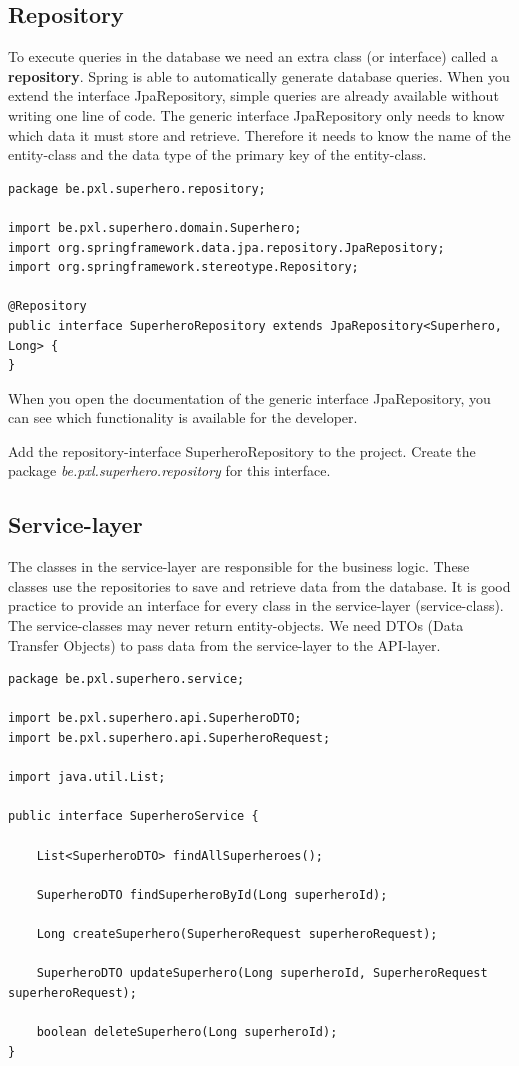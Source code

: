 \subsection{Repository}

To execute queries in the database we need an extra class (or interface) called a \textbf{repository}. Spring is able to automatically generate database queries. When you extend the interface JpaRepository, simple queries are already available without writing one line of code. 
The generic interface JpaRepository only needs to know which data it must store and retrieve.
Therefore it needs to know the name of the entity-class and the data type of the primary key of the entity-class. 

\begin{lstlisting}[frame=single]
package be.pxl.superhero.repository;

import be.pxl.superhero.domain.Superhero;
import org.springframework.data.jpa.repository.JpaRepository;
import org.springframework.stereotype.Repository;

@Repository
public interface SuperheroRepository extends JpaRepository<Superhero, Long> {
}
\end{lstlisting}

When you open the documentation of the generic interface JpaRepository, you can see which functionality is available for the developer.

\begin{oefening}
Add the repository-interface SuperheroRepository to the project.  Create the package  \textit{be.pxl.superhero.repository} for this interface.
\end{oefening}

\subsection{Service-layer}

The classes in the service-layer are responsible for the business logic. These classes use the repositories to save and retrieve data from the database.  It is good practice to provide an interface for every class in the service-layer (service-class). 
The service-classes may never return entity-objects. We need DTOs (Data Transfer Objects) to pass data from the service-layer to the API-layer.

\begin{lstlisting}[frame=single]
package be.pxl.superhero.service;

import be.pxl.superhero.api.SuperheroDTO;
import be.pxl.superhero.api.SuperheroRequest;

import java.util.List;

public interface SuperheroService {

	List<SuperheroDTO> findAllSuperheroes();

	SuperheroDTO findSuperheroById(Long superheroId);

	Long createSuperhero(SuperheroRequest superheroRequest);

	SuperheroDTO updateSuperhero(Long superheroId, SuperheroRequest superheroRequest);

	boolean deleteSuperhero(Long superheroId);
}
\end{lstlisting}


